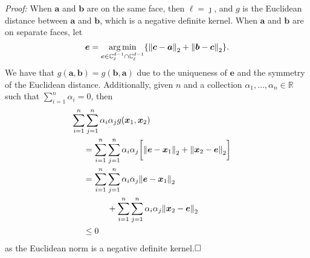 {\em Proof:}
When $\bm{a}$ and $\bm{b}$ are on the same face, then $\ell = \jmath$, and $g$ is the Euclidean distance between $\bm{a}$ and $\bm{b}$, which is a  negative definite kernel.  When $\bm{a}$ and $\bm{b}$ are on separate
  faces, let 
  \[\bm{e} = 
    \argmin_{\bm{c} \in{\mathbb C}_{\jmath}^{d-1}\cap{\mathbb C}_{\ell}^{d-1}}\left\{ 
        \pnorm{\bm{c}-\bm{a}}{2} + \pnorm{\bm{b}-\bm{c}}{2} \right\}.
  \]
  We have that $g(\bm{a}, \bm{b}) = g(\bm{b}, \bm{a})$ due to the uniqueness of $\bm{e}$ and the symmetry of the Euclidean distance. Additionally, given $n$ and  a collection $\alpha_1,\ldots,\alpha_n\in{\mathbb R}$ such that  $\sum_{i = 1}^n\alpha_i = 0$, then
  \begin{equation*}
    \begin{aligned}
      &\hspace{-0.5cm}\sum_{i = 1}^n\sum_{j = 1}^n \alpha_i\alpha_j g(\bm{x}_1,\bm{x}_2)\\
      &= \sum_{i = 1}^n\sum_{j = 1}^n \alpha_i\alpha_j \bigg[\pnorm{\bm{e} - \bm{x}_1}{2} + \pnorm{\bm{x}_2 - \bm{e}}{2}\bigg]\\
      &= \sum_{i = 1}^n\sum_{j = 1}^n \alpha_i\alpha_j\pnorm{\bm{e} - \bm{x}_1}{2}\\
      &\hspace{1cm}+ \sum_{i = 1}^n\sum_{j = 1}^n \alpha_i\alpha_j\pnorm{\bm{x}_2 - \bm{e}}{2}\\
      &\leq 0
    \end{aligned}
  \end{equation*}
  as the Euclidean norm is a negative definite kernel.$\hfill\Box$
 
